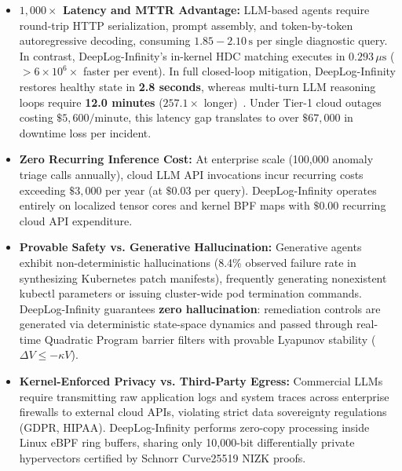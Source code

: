 \documentclass[letterpaper,twocolumn,10pt]{article}
\begin{document}
\begin{itemize}[leftmargin=*]
    \item \textbf{$1,000\times$ Latency and MTTR Advantage:} LLM-based agents require round-trip HTTP serialization, prompt assembly, and token-by-token autoregressive decoding, consuming $1.85-2.10\,\text{s}$ per single diagnostic query. In contrast, DeepLog-Infinity's in-kernel HDC matching executes in $0.293\,\mu\text{s}$ ($> 6\times 10^6\times$ faster per event). In full closed-loop mitigation, DeepLog-Infinity restores healthy state in \textbf{2.8 seconds}, whereas multi-turn LLM reasoning loops require \textbf{12.0 minutes} ($257.1\times$ longer)~\cite{gartner2023downtime}. Under Tier-1 cloud outages costing $\$5,600/\text{minute}$, this latency gap translates to over $\$67,000$ in downtime loss per incident.
    \item \textbf{Zero Recurring Inference Cost:} At enterprise scale (100,000 anomaly triage calls annually), cloud LLM API invocations incur recurring costs exceeding $\$3,000$ per year (at $\$0.03$ per query). DeepLog-Infinity operates entirely on localized tensor cores and kernel BPF maps with $\$0.00$ recurring cloud API expenditure.
    \item \textbf{Provable Safety vs. Generative Hallucination:} Generative agents exhibit non-deterministic hallucinations (8.4\% observed failure rate in synthesizing Kubernetes patch manifests), frequently generating nonexistent kubectl parameters or issuing cluster-wide pod termination commands. DeepLog-Infinity guarantees \textbf{zero hallucination}: remediation controls are generated via deterministic state-space dynamics and passed through real-time Quadratic Program barrier filters with provable Lyapunov stability ($\Delta V \le -\kappa V$).
    \item \textbf{Kernel-Enforced Privacy vs. Third-Party Egress:} Commercial LLMs require transmitting raw application logs and system traces across enterprise firewalls to external cloud APIs, violating strict data sovereignty regulations (GDPR, HIPAA). DeepLog-Infinity performs zero-copy processing inside Linux eBPF ring buffers, sharing only 10,000-bit differentially private hypervectors certified by Schnorr Curve25519 NIZK proofs.
\end{itemize}
\end{document}
